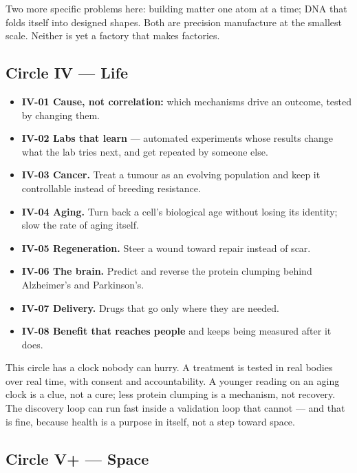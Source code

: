 \documentclass[11pt]{article}
\begin{document}
Two more specific problems here: building matter one atom at a time; DNA that folds itself into designed shapes. Both are precision manufacture at the smallest scale. Neither is yet a factory that makes factories.

\subsection*{Circle IV --- Life}

\begin{itemize}[leftmargin=1.4em,itemsep=2pt]
\item \textbf{IV-01 Cause, not correlation:} which mechanisms drive an outcome, tested by changing them.
\item \textbf{IV-02 Labs that learn} --- automated experiments whose results change what the lab tries next, and get repeated by someone else.
\item \textbf{IV-03 Cancer.} Treat a tumour as an evolving population and keep it controllable instead of breeding resistance.
\item \textbf{IV-04 Aging.} Turn back a cell's biological age without losing its identity; slow the rate of aging itself.
\item \textbf{IV-05 Regeneration.} Steer a wound toward repair instead of scar.
\item \textbf{IV-06 The brain.} Predict and reverse the protein clumping behind Alzheimer's and Parkinson's.
\item \textbf{IV-07 Delivery.} Drugs that go only where they are needed.
\item \textbf{IV-08 Benefit that reaches people} and keeps being measured after it does.
\end{itemize}

This circle has a clock nobody can hurry. A treatment is tested in real bodies over real time, with consent and accountability. A younger reading on an aging clock is a clue, not a cure; less protein clumping is a mechanism, not recovery. The discovery loop can run fast inside a validation loop that cannot --- and that is fine, because health is a purpose in itself, not a step toward space.

\subsection*{Circle V+ --- Space}
\end{document}
